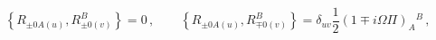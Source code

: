 \begin{equation}
\left\{R_{\pm 0A(u)},R_{\pm 0(v)}^B\right\}=0\,,\qquad
\left\{R_{\pm 0A(u)},R_{\mp 0(v)}^B\right\}=\delta_{uv}\frac{1}{2}(1\mp i\Omega\Pi)_A{}^B\,,
\end{equation}

